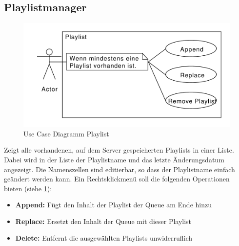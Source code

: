 \subsection{Playlistmanager}
\begin{figure}[htb!]
    \centering
    \includegraphics[width=\textwidth]{./gfx/usec/playlist}
    \caption{Use Case Diagramm Playlist}
    \label{uc_playlist}
\end{figure}
Zeigt alle vorhandenen, auf dem Server gespeicherten Playlists in einer Liste.
Dabei wird in der Liste der Playlistname und das letzte Änderungsdatum angezeigt.
Die Namenszellen sind editierbar, so dass der Playlistname einfach geändert werden kann. 
Ein Rechtsklickmenü soll die folgenden Operationen bieten (siehe \ref{uc_playlist}):
\begin{itemize}
    \item \textbf{Append:} Fügt den Inhalt der Playlist der Queue am Ende hinzu
    \item \textbf{Replace:} Ersetzt den Inhalt der Queue mit dieser Playlist
    \item \textbf{Delete:} Entfernt die ausgewählten Playlists unwiderruflich
\end{itemize}   


